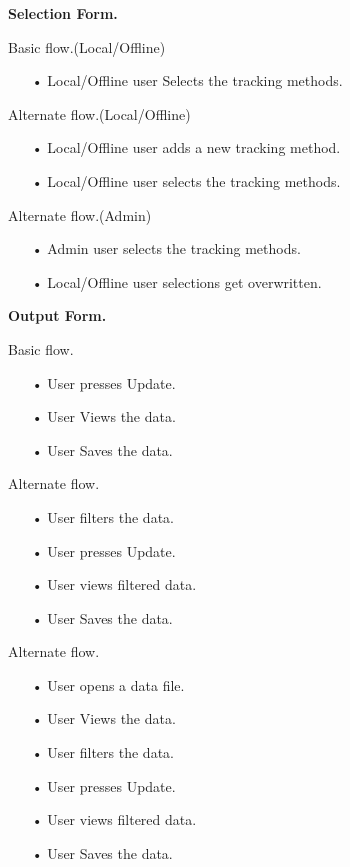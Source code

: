 \begin{flushleft}
\textbf{Selection Form.}\par
Basic flow.(Local/Offline)\par
\begin{enumerate}
		\item[•] Local/Offline user Selects the tracking methods.
\end{enumerate}
Alternate flow.(Local/Offline)\par
\begin{enumerate}
    	\item[•] Local/Offline user adds a new tracking method.
    	\item[•] Local/Offline user selects the tracking methods.
\end{enumerate}
Alternate flow.(Admin)\par
\begin{enumerate}
		\item[•] Admin user selects the tracking methods.
    	\item[•] Local/Offline user selections get overwritten.
\end{enumerate}
\newpage\textbf{Output Form.}\par
Basic flow.\par
\begin{enumerate}
        \item[•] User presses Update.
		\item[•] User Views the data.
		\item[•] User Saves the data.
\end{enumerate}
Alternate flow.\par
\begin{enumerate}
    	\item[•] User filters the data.
    	\item[•] User presses Update.
    	\item[•] User views filtered data.
    	\item[•] User Saves the data.
\end{enumerate}
Alternate flow.\par
\begin{enumerate}
		\item[•] User opens a data file.
    	\item[•] User Views the data.
    	\item[•] User filters the data.
    	\item[•] User presses Update.
    	\item[•] User views filtered data.
    	\item[•] User Saves the data. 
\end{enumerate}
\end{flushleft}
\clearpage
